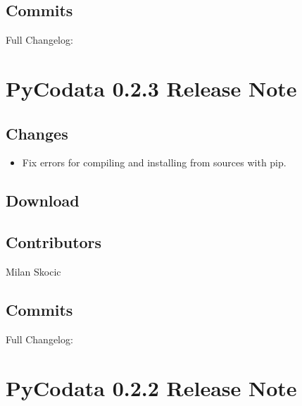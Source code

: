 \documentclass[a4paper,10pt,english]{sphinxmanual}
\begin{document}
\subsection{Commits}
\label{\detokenize{releases/0.2.4-notes:commits}}
\sphinxAtStartPar
Full Changelog: 

\sphinxstepscope


\section{PyCodata 0.2.3 Release Note}
\label{\detokenize{releases/0.2.3-notes:pycodata-0-2-3-release-note}}\label{\detokenize{releases/0.2.3-notes::doc}}

\subsection{Changes}
\label{\detokenize{releases/0.2.3-notes:changes}}\begin{itemize}
\item {} 
\sphinxAtStartPar
Fix errors for compiling and installing from sources with pip.

\end{itemize}


\subsection{Download}
\label{\detokenize{releases/0.2.3-notes:download}}
\sphinxAtStartPar
{}


\subsection{Contributors}
\label{\detokenize{releases/0.2.3-notes:contributors}}
\sphinxAtStartPar
Milan Skocic


\subsection{Commits}
\label{\detokenize{releases/0.2.3-notes:commits}}
\sphinxAtStartPar
Full Changelog: 

\sphinxstepscope


\section{PyCodata 0.2.2 Release Note}
\label{\detokenize{releases/0.2.2-notes:pycodata-0-2-2-release-note}}\label{\detokenize{releases/0.2.2-notes::doc}}
\end{document}
